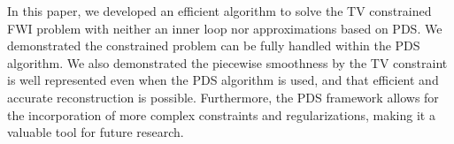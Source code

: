 In this paper, we developed an efficient algorithm to solve the TV constrained FWI problem with neither an inner loop nor approximations based on PDS.
We demonstrated the constrained problem can be fully handled within the PDS algorithm.
We also demonstrated the piecewise smoothness by the TV constraint is well represented even when the PDS algorithm is used, and that efficient and accurate reconstruction is possible.
Furthermore, the PDS framework allows for the incorporation of more complex constraints and regularizations, making it a valuable tool for future research.
